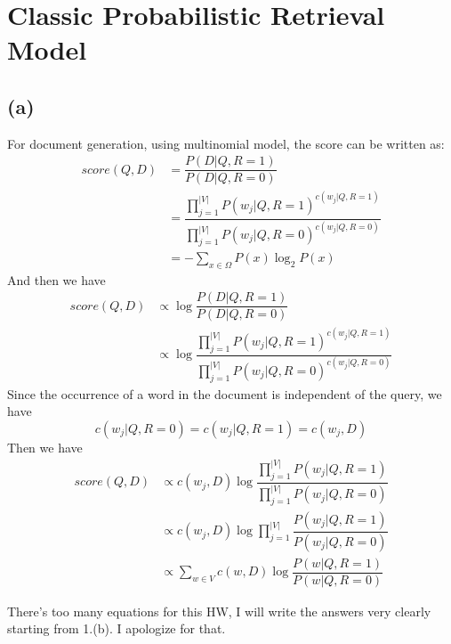 

\oddsidemargin 0in
\evensidemargin 0in
\textwidth 6.5in
\topmargin -0.5in
\textheight 9.0in
\usepackage{amsmath}





\pagestyle{myheadings}  %

\section{Classic Probabilistic Retrieval Model}
\subsection{(a)}
For document generation, using multinomial model, the score can be written as:
\begin{align*}
score(Q,D)&= \dfrac{P(D|Q,R=1)}{P(D|Q,R=0)}\\
&=\dfrac{\prod_{j=1} ^{|V|}{P(w_j|Q,R=1)}^{c(w_j|Q,R=1)}}{\prod_{j=1} ^{|V|}{P(w_j|Q,R=0)}^{c(w_j|Q,R=0)}} \\
&=
-\sum_{x\in\Omega}P(x)\log_2 P(x)
\end{align*}
And then we have 
\begin{align*}
score(Q,D)&\propto \log{\dfrac{P(D|Q,R=1)}{P(D|Q,R=0)}} \\
&\propto \log{\dfrac{\prod_{j=1} ^{|V|}{P(w_j|Q,R=1)}^{c(w_j|Q,R=1)}}{\prod_{j=1} ^{|V|}{P(w_j|Q,R=0)}^{c(w_j|Q,R=0)}}}
\end{align*}
Since the occurrence of a word in the document is independent of the query, we have
\begin{equation*}
c(w_j|Q,R=0)=c(w_j|Q,R=1)=c(w_j,D)
\end{equation*}
Then we have 
\begin{align*}
score(Q,D) &\propto c(w_j,D)\log{\dfrac{\prod_{j=1} ^{|V|}{P(w_j|Q,R=1)}}{\prod_{j=1} ^{|V|}{P(w_j|Q,R=0)}}}\\
&\propto c(w_j,D)\log{\prod_{j=1} ^{|V|}\dfrac{{P(w_j|Q,R=1)}}{{P(w_j|Q,R=0)}}}\\
&\propto \sum_{w\in V}c(w,D)\log{\dfrac{{P(w|Q,R=1)}}{{P(w|Q,R=0)}}}
\end{align*}

There's too many equations for this HW, I will write the answers very clearly starting from 1.(b).
I apologize for that. 



